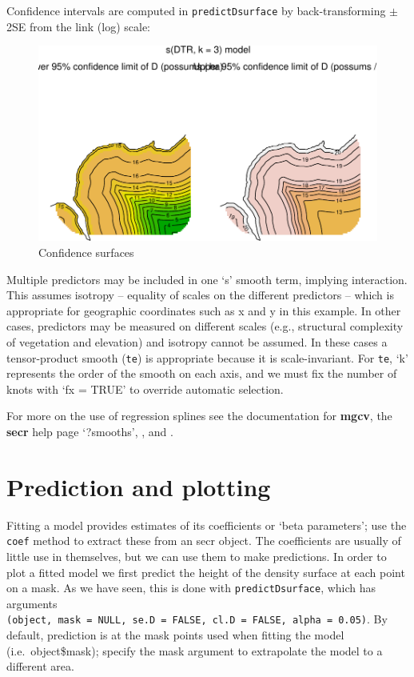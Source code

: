 \documentclass[
]{book}
\begin{document}
Confidence intervals are computed in \texttt{predictDsurface} by back-transforming \(\pm\) 2SE from the link (log) scale:

\begin{figure}
\includegraphics[width=0.95\linewidth]{SECRbook_files/figure-latex/CIplot-1} \caption{Confidence surfaces}\label{fig:CIplot}
\end{figure}

Multiple predictors may be included in one `s' smooth term, implying interaction. This assumes isotropy -- equality of scales on the different predictors -- which is appropriate for geographic coordinates such as x and y in this example. In other cases, predictors may be measured on different scales (e.g., structural complexity of vegetation and elevation) and isotropy cannot be assumed. In these cases a tensor-product smooth (\texttt{te}) is appropriate because it is scale-invariant. For \texttt{te}, `k' represents the order of the smooth on each axis, and we must fix the number of knots with `fx = TRUE' to override automatic selection.

For more on the use of regression splines see the documentation for \textbf{mgcv}, the \textbf{secr} help page `?smooths', \citet{w06}, and \citet{bk14}.

\section{Prediction and plotting}\label{prediction-and-plotting}


Fitting a model provides estimates of its coefficients or `beta parameters'; use the \texttt{coef} method to extract these from an secr object. The coefficients are usually of little use in themselves, but we can use them to make predictions. In order to plot a fitted model we first predict the height of the density surface at each point on a mask. As we have seen, this is done with \texttt{predictDsurface}, which has arguments \texttt{(object,\ mask\ =\ NULL,\ se.D\ =\ FALSE,\ cl.D\ =\ FALSE,\ alpha\ =\ 0.05)}. By default, prediction is at the mask points used when fitting the model (i.e.~object\$mask); specify the mask argument to extrapolate the model to a different area.
\end{document}
